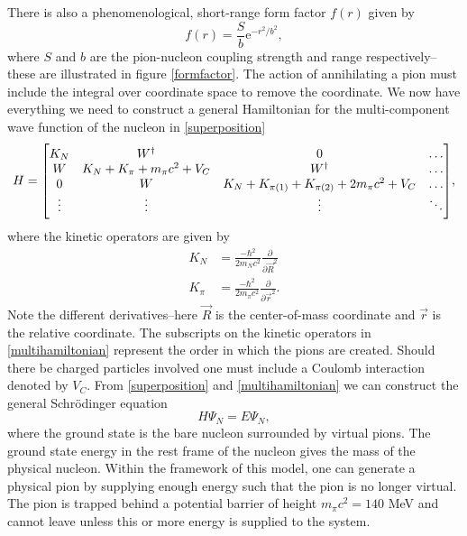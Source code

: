 There is also a phenomenological, short-range form factor $f(r)$ given by
\begin{equation}\label{formfactoreq}
	f(r) = \frac{S}{b} \text{e}^{-r^2/b^2},
\end{equation}
where $S$ and $b$ are the pion-nucleon coupling strength and range respectively--these are illustrated in figure \ref{formfactor}. The action of annihilating a pion must include the integral over coordinate space to remove the coordinate. We now have everything we need to construct a general Hamiltonian for the multi-component wave function of the nucleon in \eqref{superposition}
\begin{equation} \label{multihamiltonian}
	H = \mqty[K_N & W^\dagger & 0 &\ldots \\
	W & K_N+K_\pi+m_\pi c^2+V_C & W^\dagger & \ldots \\
	0 & W & K_N+K_{\pi(1)}+K_{\pi(2)}+2m_\pi c^2 +V_C & \ldots \\
	\vdots & \vdots & \vdots &\ddots ],
\end{equation}
where the kinetic operators are given by
\begin{align} \label{multiN}
	K_N &= \frac{-\hbar^2}{2 m_N c^2} \frac{\partial}{\partial \vec{R}^2} \\
	K_\pi &= \frac{-\hbar^2}{2 m_\pi c^2} \frac{\partial}{\partial \vec{r}^2} \label{kinpi}.
\end{align} 
Note the different derivatives--here $\vec{R}$ is the center-of-mass coordinate and $\vec{r}$ is the relative coordinate. The subscripts on the kinetic operators in \eqref{multihamiltonian} represent the order in which the pions are created. Should there be charged particles involved one must include a Coulomb interaction denoted by $V_C$. From \eqref{superposition} and \eqref{multihamiltonian} we can construct the general Schrödinger equation
\begin{equation} \label{MultiSE}
	H \Psi_N = E \Psi_N,
\end{equation}
where the ground state is the bare nucleon surrounded by virtual pions. The ground state energy in the rest frame of the nucleon gives the mass of the physical nucleon. Within the framework of this model, one can generate a physical pion by supplying enough energy such that the pion is no longer virtual. The pion is trapped behind a potential barrier of height $m_\pi c^2 = 140$ MeV and cannot leave unless this or more energy is supplied to the system.  
